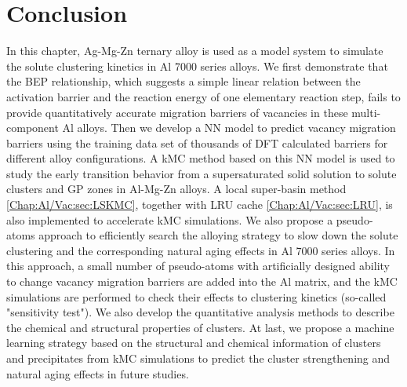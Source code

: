 \section{Conclusion}
\label{Chap:Al/Vac:section:Conc}


In this chapter, Ag-Mg-Zn ternary alloy is used as a model system to simulate the solute clustering kinetics in Al 7000 series alloys. We first demonstrate that the \acf{BEP} relationship, which suggests a simple linear relation between the activation barrier and the reaction energy of one elementary reaction step, fails to provide quantitatively accurate migration barriers of vacancies in these multi-component Al alloys. Then we develop a \ac{NN} model to predict vacancy migration barriers using the training data set of thousands of \ac{DFT} calculated barriers for different alloy configurations. A \ac{kMC} method based on this \ac{NN} model is used to study the early transition behavior from a supersaturated solid solution to solute clusters and \acf{GP} zones in Al-Mg-Zn alloys. A local super-basin method  \ref{Chap:Al/Vac:sec:LSKMC}, together with \ac{LRU} cache \ref{Chap:Al/Vac:sec:LRU}, is also implemented to accelerate \ac{kMC} simulations. We also propose a pseudo-atoms approach to efficiently search the alloying strategy to slow down the solute clustering and the corresponding natural aging effects in Al 7000 series alloys. In this approach, a small number of pseudo-atoms with artificially designed ability to change vacancy migration barriers are added into the Al matrix, and the \ac{kMC} simulations are performed to check their effects to clustering kinetics (so-called "sensitivity test"). We also develop the quantitative analysis methods to describe the chemical and structural properties of clusters. At last, we propose a machine learning strategy based on the structural and chemical information of clusters and precipitates from \ac{kMC} simulations to predict the cluster strengthening and natural aging effects in future studies.


